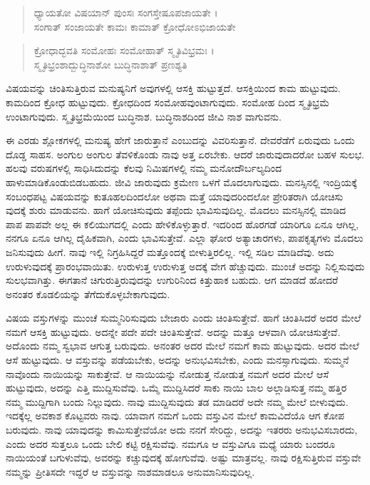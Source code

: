 \begin{verse}
ಧ್ಯಾಯತೋ ವಿಷಯಾನ್ ಪುಂಸಃ ಸಂಗಸ್ತೇಷೂಪಜಾಯತೇ ।\\ಸಂಗಾತ್ ಸಂಜಾಯತೇ ಕಾಮಃ ಕಾಮಾತ್ ಕ್ರೋಧೋಽಭಿಜಾಯತೇ 
\end{verse}

\begin{verse}
ಕ್ರೋಧಾದ್ಭವತಿ ಸಂಮೋಹಃ ಸಂಮೋಹಾತ್ ಸ್ಮೃತಿವಿಭ್ರಮಃ ।\\ಸ್ಮೃತಿಭ್ರಂಶಾದ್ಬುದ್ಧಿನಾಶೋ ಬುದ್ಧಿನಾಶಾತ್ ಪ್ರಣಶ್ಯತಿ 
\end{verse}

{\small ವಿಷಯವನ್ನು ಚಿಂತಿಸುತ್ತಿರುವ ಮನುಷ್ಯನಿಗೆ ಅವುಗಳಲ್ಲಿ ಆಸಕ್ತಿ ಹುಟ್ಟುತ್ತದೆ. ಆಸಕ್ತಿಯಿಂದ ಕಾಮ ಹುಟ್ಟುವುದು. ಕಾಮದಿಂದ ಕ್ರೋಧ ಹುಟ್ಟುವುದು. ಕ್ರೋಧದಿಂದ ಸಂಮೋಹವುಂಟಾಗುವುದು. ಸಂಮೋಹ ದಿಂದ ಸ್ಮೃತಿಭ್ರಮೆ ಉಂಟಾಗುವುದು. ಸ್ಮೃತಿಭ್ರಮೆಯಿಂದ ಬುದ್ಧಿನಾಶ. ಬುದ್ಧಿನಾಶದಿಂದ ಜೀವಿ ನಾಶ ವಾಗುವನು.}

ಈ ಎರಡು ಶ್ಲೋಕಗಳಲ್ಲಿ ಮನುಷ್ಯ ಹೇಗೆ ಜಾರುತ್ತಾನೆ ಎಂಬುದನ್ನು ವಿವರಿಸುತ್ತಾನೆ. ದೇವರೆಡೆಗೆ ಏರುವುದು ಒಂದು ದೊಡ್ಡ ಸಾಹಸ. ಅಂಗುಲ ಅಂಗುಲ ತೆವಳಿಕೊಂಡು ನಾವು ಅತ್ತ ಏರಬೇಕು. ಆದರೆ ಜಾರುವುದಾದರೋ ಬಹಳ ಸುಲಭ. ಹಲವು ವರುಷಗಳಲ್ಲಿ ಸಾಧಿಸಿದುದನ್ನು ಕೆಲವು ನಿಮಿಷಗಳಲ್ಲಿ ನಮ್ಮ ಮನೋದೌರ್ಬಲ್ಯದಿಂದ ಹಾಳುಮಾಡಿಕೊಂಡುಬಿಡಬಹುದು. ಜೀವಿ ಜಾರುವುದು ಕ್ರಮೇಣ ಒಳಗೆ ಮೊದಲಾಗುವುದು. ಮನಸ್ಸಿನಲ್ಲಿ ಇಂದ್ರಿಯಕ್ಕೆ ಸಂಬಂಧಪಟ್ಟ ವಿಷಯವನ್ನು ಕುತೂಹಲದಿಂದಲೋ ಅಥವಾ ಮತ್ತೆ ಯಾವುದರಿಂದಲೋ ಪ್ರೇರಿತರಾಗಿ ಯೋಚಿಸು ವುದಕ್ಕೆ ಶುರು ಮಾಡುವನು. ಹಾಗೆ ಯೋಚಿಸುವುದು ತಪ್ಪೆಂದು ಭಾವಿಸುವುದಿಲ್ಲ. ಮೊದಲು ಮನಸ್ಸಿನಲ್ಲಿ ಮಾಡಿದ ಪಾಪ ಪಾಪವೇ ಅಲ್ಲ ಈ ಕಲಿಯುಗದಲ್ಲಿ ಎಂದು ಹೇಳಿಕೊಳ್ಳುತ್ತಾರೆ. ಇದರಿಂದ ಹೊರಗಡೆ ಯಾರಿಗೂ ಏನೂ ಆಗಿಲ್ಲ, ನನಗೂ ಏನೂ ಆಗಿಲ್ಲ ದೈಹಿಕವಾಗಿ, ಎಂದು ಭಾವಿಸುತ್ತೇವೆ. ಎಲ್ಲಾ ಘೋರ ಅತ್ಯಾಚಾರಗಳು, ಪಾಪಕೃತ್ಯಗಳು ಮೊದಲು ಜನಿಸುವುದು ಹೀಗೆ. ನಾವು ಇಲ್ಲಿ ನಿಗ್ರಹಿಸಿದ್ದರೆ ಮತ್ತೊಂದಕ್ಕೆ ಬೀಳುತ್ತಿರಲಿಲ್ಲ. ಇಲ್ಲಿ ಸಡಿಲ ಮಾಡಿದೆವು. ಅದು ಉರುಳುವುದಕ್ಕೆ ಪ್ರಾರಂಭವಾಯಿತು. ಉರುಳುತ್ತ ಉರುಳುತ್ತ ಅದಕ್ಕೆ ವೇಗ ಹೆಚ್ಚುವುದು. ಮುಂಚೆ ಅದನ್ನು ನಿಲ್ಲಿಸುವುದು ಸುಲಭವಾಗಿತ್ತು. ಈಗತಾನೆ ಚಿಗುರುತ್ತಿರುವುದನ್ನು ಉಗುರಿನಿಂದ ಕಿತ್ತುಹಾಕ ಬಹುದು. ಆಗ ಮಾಡದೆ ಹೋದರೆ ಅನಂತರ ಕೊಡಲಿಯನ್ನು ತೆಗೆದುಕೊಳ್ಳಬೇಕಾಗುವುದು.

ವಿಷಯ ವಸ್ತುಗಳನ್ನು ಮುಂಚೆ ಸುಮ್ಮನಿರಿಸುವುದು ಬೇಜಾರು ಎಂದು ಚಿಂತಿಸುತ್ತೇವೆ. ಹಾಗೆ ಚಿಂತಿಸಿದರೆ ಅದರ ಮೇಲೆ ನಮಗೆ ಆಸಕ್ತಿ ಹುಟ್ಟುವುದು. ಅದನ್ನೇ ಪದೇ ಪದೇ ಚಿಂತಿಸುತ್ತೇವೆ. ಅದನ್ನು ಮತ್ತೂ ಆಳವಾಗಿ ಯೋಚಿಸುತ್ತೇವೆ. ಅದೊಂದು ನಮ್ಮ ಸ್ವಭಾವ ಆಗುತ್ತ ಬರುವುದು. ಅನಂತರ ಅದರ ಮೇಲೆ ನಮಗೆ ಕಾಮ ಹುಟ್ಟುವುದು. ಅದರ ಮೇಲೆ ಆಸೆ ಹುಟ್ಟುವುದು. ಆ ವಸ್ತುವನ್ನು ಪಡೆಯಬೇಕು, ಅದನ್ನು ಅನುಭವಿಸಬೇಕು, ಎಂದು ಮನಸ್ಸಾಗುವುದು. ಸುಮ್ಮನೆ ನಾವೊಂದು ನಾಯಿಯನ್ನು ಸಾಕುತ್ತೇವೆ. ಆ ನಾಯಿಯನ್ನು ನೋಡುತ್ತ ನೋಡುತ್ತ ನಮಗೆ ಅದರ ಮೇಲೆ ಆಸೆ ಹುಟ್ಟುವುದು, ಅದನ್ನು ಎತ್ತಿ ಮುದ್ದಿಸುವೆವು. ಒಮ್ಮೆ ಮುದ್ದಿಸಿದರೆ ಸಾಕು ನಾಯಿ ಬಾಲ ಅಲ್ಲಾಡಿಸುತ್ತ ನಮ್ಮ ಹತ್ತಿರ ನಮ್ಮ ಮುದ್ದಿಗಾಗಿ ಬಂದು ನಿಲ್ಲುವುದು. ನಾವು ಮುದ್ದಿಸುವುದು ತಡ ಮಾಡಿದರೆ ಅದೇ ನಮ್ಮ ಮೇಲೆ ಬೀಳುವುದು. ಇದಕ್ಕೆಲ್ಲ ಅವಕಾಶ ಕೊಟ್ಟವರು ನಾವು. ಯಾವಾಗ ನಮಗೆ ಒಂದು ವಸ್ತುವಿನ ಮೇಲೆ ಕಾಮವಿದೆಯೊ ಆಗ ಕೋಪ ಬರುವುದು. ನಾವು ಯಾವುದನ್ನು ಕಾಮಿಸುತ್ತೇವೆಯೋ ಅದು ನನಗೆ ಸೇರಿದ್ದು, ಅದನ್ನು ಇತರರು ಅನುಭವಿಸಬಾರದು, ಎಂದು ಅದರ ಸುತ್ತಲೂ ಒಂದು ಬೇಲಿ ಕಟ್ಟಿ ರಕ್ಷಿಸುವೆವು. ನಮಗೂ ಆ ವಸ್ತುವಿಗೂ ಮಧ್ಯೆ ಯಾರು ಬಂದರೂ ನಾಯಿಯಂತೆ ಬಗುಳುವೆವು, ಅವರನ್ನು ಕಚ್ಚುವುದಕ್ಕೆ ಹೋಗುವೆವು. ಅಷ್ಟು ಮಾತ್ರವಲ್ಲ. ನಾವು ರಕ್ಷಿಸುತ್ತಿರುವ ವಸ್ತುವೇ ನಮ್ಮನ್ನು ಪ್ರೀತಿಸದೇ ಇದ್ದರೆ ಆ ವಸ್ತುವನ್ನು ನಾಶಮಾಡಲೂ ಅನುಮಾನಿಸುವುದಿಲ್ಲ.


